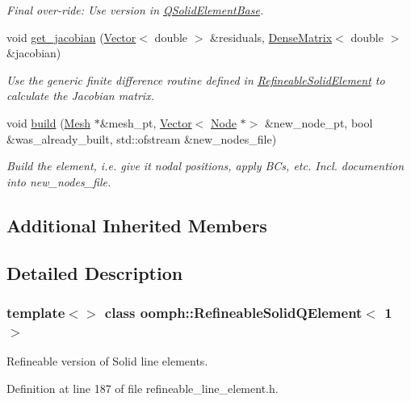 \begin{DoxyCompactItemize}
\begin{DoxyCompactList}\small\item\em Final over-\/ride\+: Use version in \hyperlink{classoomph_1_1QSolidElementBase}{Q\+Solid\+Element\+Base}. \end{DoxyCompactList}\item 
void \hyperlink{classoomph_1_1RefineableSolidQElement_3_011_01_4_a61a037cc3669af9204c9fa764e5c7081}{get\+\_\+jacobian} (\hyperlink{classoomph_1_1Vector}{Vector}$<$ double $>$ \&residuals, \hyperlink{classoomph_1_1DenseMatrix}{Dense\+Matrix}$<$ double $>$ \&jacobian)
\begin{DoxyCompactList}\small\item\em Use the generic finite difference routine defined in \hyperlink{classoomph_1_1RefineableSolidElement}{Refineable\+Solid\+Element} to calculate the Jacobian matrix. \end{DoxyCompactList}\item 
void \hyperlink{classoomph_1_1RefineableSolidQElement_3_011_01_4_a6b534dd58082904153161cba4034b62f}{build} (\hyperlink{classoomph_1_1Mesh}{Mesh} $\ast$\&mesh\+\_\+pt, \hyperlink{classoomph_1_1Vector}{Vector}$<$ \hyperlink{classoomph_1_1Node}{Node} $\ast$$>$ \&new\+\_\+node\+\_\+pt, bool \&was\+\_\+already\+\_\+built, std\+::ofstream \&new\+\_\+nodes\+\_\+file)
\begin{DoxyCompactList}\small\item\em Build the element, i.\+e. give it nodal positions, apply B\+Cs, etc. Incl. documention into new\+\_\+nodes\+\_\+file. \end{DoxyCompactList}\end{DoxyCompactItemize}
\subsection*{Additional Inherited Members}


\subsection{Detailed Description}
\subsubsection*{template$<$$>$\newline
class oomph\+::\+Refineable\+Solid\+Q\+Element$<$ 1 $>$}

Refineable version of Solid line elements. 

Definition at line 187 of file refineable\+\_\+line\+\_\+element.\+h.



